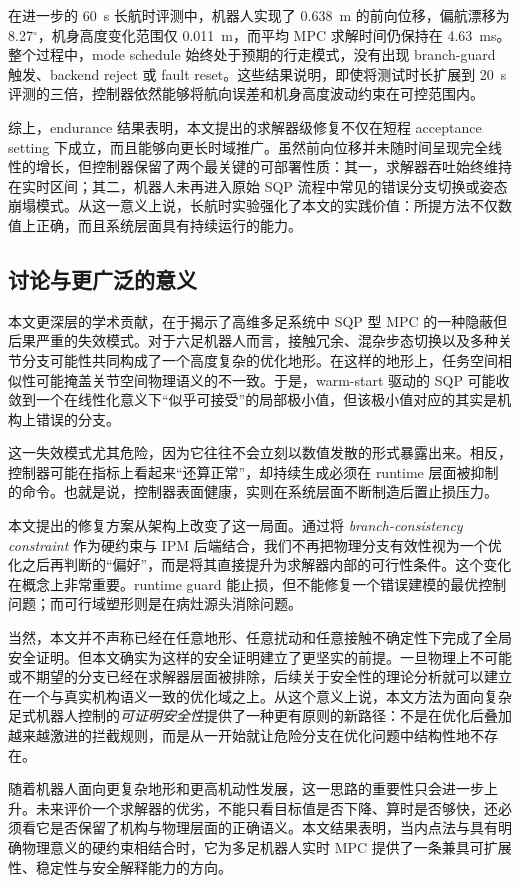 在进一步的 60~s 长航时评测中，机器人实现了 0.638~m 的前向位移，偏航漂移为 8.27$^\circ$，机身高度变化范围仅 0.011~m，而平均 MPC 求解时间仍保持在 4.63~ms。整个过程中，mode schedule 始终处于预期的行走模式，没有出现 branch-guard 触发、backend reject 或 fault reset。这些结果说明，即使将测试时长扩展到 20~s 评测的三倍，控制器依然能够将航向误差和机身高度波动约束在可控范围内。

综上，endurance 结果表明，本文提出的求解器级修复不仅在短程 acceptance setting 下成立，而且能够向更长时域推广。虽然前向位移并未随时间呈现完全线性的增长，但控制器保留了两个最关键的可部署性质：其一，求解器吞吐始终维持在实时区间；其二，机器人未再进入原始 SQP 流程中常见的错误分支切换或姿态崩塌模式。从这一意义上说，长航时实验强化了本文的实践价值：所提方法不仅数值上正确，而且系统层面具有持续运行的能力。

\subsection{讨论与更广泛的意义}

本文更深层的学术贡献，在于揭示了高维多足系统中 SQP 型 MPC 的一种隐蔽但后果严重的失效模式。对于六足机器人而言，接触冗余、混杂步态切换以及多种关节分支可能性共同构成了一个高度复杂的优化地形。在这样的地形上，任务空间相似性可能掩盖关节空间物理语义的不一致。于是，warm-start 驱动的 SQP 可能收敛到一个在线性化意义下“似乎可接受”的局部极小值，但该极小值对应的其实是机构上错误的分支。

这一失效模式尤其危险，因为它往往不会立刻以数值发散的形式暴露出来。相反，控制器可能在指标上看起来“还算正常”，却持续生成必须在 runtime 层面被抑制的命令。也就是说，控制器表面健康，实则在系统层面不断制造后置止损压力。

本文提出的修复方案从架构上改变了这一局面。通过将 \emph{branch-consistency constraint} 作为硬约束与 IPM 后端结合，我们不再把物理分支有效性视为一个优化之后再判断的“偏好”，而是将其直接提升为求解器内部的可行性条件。这个变化在概念上非常重要。runtime guard 能止损，但不能修复一个错误建模的最优控制问题；而可行域塑形则是在病灶源头消除问题。

当然，本文并不声称已经在任意地形、任意扰动和任意接触不确定性下完成了全局安全证明。但本文确实为这样的安全证明建立了更坚实的前提。一旦物理上不可能或不期望的分支已经在求解器层面被排除，后续关于安全性的理论分析就可以建立在一个与真实机构语义一致的优化域之上。从这个意义上说，本文方法为面向复杂足式机器人控制的\emph{可证明安全性}提供了一种更有原则的新路径：不是在优化后叠加越来越激进的拦截规则，而是从一开始就让危险分支在优化问题中结构性地不存在。

随着机器人面向更复杂地形和更高机动性发展，这一思路的重要性只会进一步上升。未来评价一个求解器的优劣，不能只看目标值是否下降、算时是否够快，还必须看它是否保留了机构与物理层面的正确语义。本文结果表明，当内点法与具有明确物理意义的硬约束相结合时，它为多足机器人实时 MPC 提供了一条兼具可扩展性、稳定性与安全解释能力的方向。
